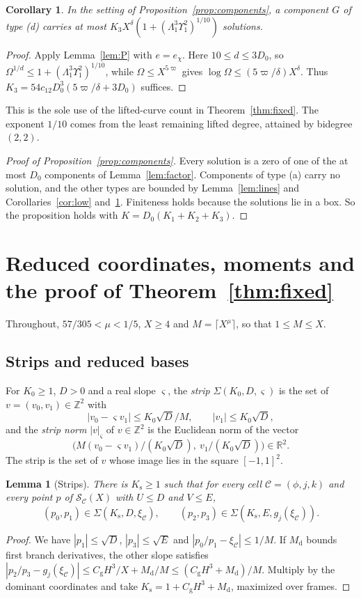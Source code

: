 \documentclass[11pt,reqno]{amsart}
\newtheorem{lemma}[theorem]{Lemma}
\newtheorem{corollary}[theorem]{Corollary}
\theoremstyle{definition}
\theoremstyle{remark}
\numberwithin{equation}{section}
\newcommand{\R}{\mathbb R}\newcommand{\Z}{\mathbb Z}\newcommand{\N}{\mathbb N}
\begin{document}
\begin{corollary}\label{cor:high}
In the setting of Proposition~\ref{prop:components}, a
component $G$ of type \textup{(d)} carries at most
$K_3X^{\delta}(1+(\Lambda_1^3\Upsilon_1^2)^{1/10})$ solutions.
\end{corollary}
\begin{proof}
Apply Lemma~\ref{lem:P} with $e=e_\chi$. Here $10\le d\le3D_0$,
so $\Omega^{1/d}\le1+(\Lambda_1^3\Upsilon_1^2)^{1/10}$, while
$\Omega\le X^{5\varpi}$ gives
$\log\Omega\le(5\varpi/\delta)X^\delta$.
Thus $K_3=54c_{12}D_0^3(5\varpi/\delta+3D_0)$ suffices.
\end{proof}
This is the sole use of the lifted-curve count in Theorem~\ref{thm:fixed}.
The exponent $1/10$ comes from the least remaining lifted degree,
attained by bidegree $(2,2)$.

\begin{proof}[Proof of Proposition~\ref{prop:components}]
Every solution is a zero of one of the at most $D_0$ components of
Lemma~\ref{lem:factor}. Components of type (a) carry no solution, and the
other types are bounded by Lemma~\ref{lem:lines} and
Corollaries~\ref{cor:low} and~\ref{cor:high}. Finiteness holds because the
solutions lie in a box. So the proposition holds with
$K=D_0(K_1+K_2+K_3)$.
\end{proof}
\section{Reduced coordinates, moments and the proof of Theorem~\ref{thm:fixed}}\label{sec:sum}
Throughout, $57/305<\mu<1/5$, $X\ge4$ and
$M=\lceil X^\mu\rceil$, so that $1\le M\le X$.

\subsection{Strips and reduced bases}
For $K_0\ge1$, $D>0$ and a real slope $\varsigma$, the \emph{strip}
$\Sigma(K_0,D,\varsigma)$ is the set of $v=(v_0,v_1)\in\Z^2$ with
\[
 |v_0-\varsigma v_1|\le K_0\sqrt D/M,\qquad|v_1|\le K_0\sqrt D,
\]
and the \emph{strip norm} $|v|_{\varsigma}$ of $v\in\Z^2$ is the Euclidean norm
of the vector
\[
 \bigl(M(v_0-\varsigma v_1)/(K_0\sqrt D),\ v_1/(K_0\sqrt D)\bigr)\in\R^2.
\]
The strip is the set of $v$ whose image lies in the square $[-1,1]^2$.

\begin{lemma}[Strips]\label{lem:strips}
There is $K_{\mathrm s}\ge1$ such that for every cell
$\mathcal C=(\phi,j,k)$ and every point $p$ of $\mathcal S_{\mathcal C}(X)$
with $U\le D$ and $V\le E$,
\[
 (p_0,p_1)\in\Sigma(K_{\mathrm s},D,\xi_{\mathcal C}),\qquad
 (p_2,p_3)\in\Sigma(K_{\mathrm s},E,g_j(\xi_{\mathcal C})).
\]
\end{lemma}
\begin{proof}
We have $|p_1|\le\sqrt D$, $|p_3|\le\sqrt E$ and
$|p_0/p_1-\xi_{\mathcal C}|\le1/M$. If $M_{\mathrm d}$ bounds first
branch derivatives, the other slope satisfies
$|p_2/p_3-g_j(\xi_{\mathcal C})|\le C_{\mathrm g}H^3/X+M_{\mathrm d}/M
\le(C_{\mathrm g}H^3+M_{\mathrm d})/M$.
Multiply by the dominant coordinates and take
$K_{\mathrm s}=1+C_{\mathrm g}H^3+M_{\mathrm d}$, maximized over frames.
\end{proof}
\end{document}
